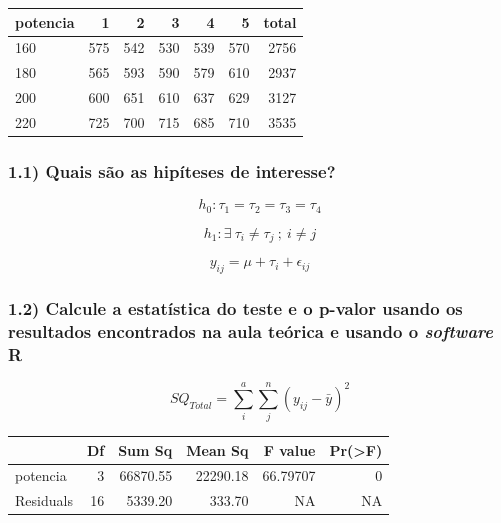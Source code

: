 \documentclass[
  a4paper]{article}
\begin{document}
\begin{longtable}[]{@{}lrrrrrr@{}}
\toprule()
potencia & 1 & 2 & 3 & 4 & 5 & total \\
\midrule()
\endhead
160 & 575 & 542 & 530 & 539 & 570 & 2756 \\
180 & 565 & 593 & 590 & 579 & 610 & 2937 \\
200 & 600 & 651 & 610 & 637 & 629 & 3127 \\
220 & 725 & 700 & 715 & 685 & 710 & 3535 \\
\bottomrule()
\end{longtable}

\newpage

\hypertarget{quais-suxe3o-as-hipuxedteses-de-interesse}{%
\subsubsection{1.1) Quais são as hipíteses de
interesse?}\label{quais-suxe3o-as-hipuxedteses-de-interesse}}

\[h_0: \tau_1 = \tau_2 = \tau_3 = \tau_4 \]

\[h_1: \exists \ \tau_i \neq \tau_j \ ; \ i \neq j\]

\[y_{ij} = \mu + \tau_i + \epsilon_{ij}\]

\hypertarget{calcule-a-estatuxedstica-do-teste-e-o-p-valor-usando-os-resultados-encontrados-na-aula-teuxf3rica-e-usando-o-software-r}{%
\subsubsection{\texorpdfstring{1.2) Calcule a estatística do teste e o
p-valor usando os resultados encontrados na aula teórica e usando o
\emph{software}
\textbf{R}}{1.2) Calcule a estatística do teste e o p-valor usando os resultados encontrados na aula teórica e usando o software R}}\label{calcule-a-estatuxedstica-do-teste-e-o-p-valor-usando-os-resultados-encontrados-na-aula-teuxf3rica-e-usando-o-software-r}}

\[ SQ_{Total} = \sum_i^a\sum_j^n(y_{ij}-\bar{y})^2 \]

\begin{longtable}[]{@{}lrrrrr@{}}
\toprule()
& Df & Sum Sq & Mean Sq & F value & Pr(\textgreater F) \\
\midrule()
\endhead
potencia & 3 & 66870.55 & 22290.18 & 66.79707 & 0 \\
Residuals & 16 & 5339.20 & 333.70 & NA & NA \\
\bottomrule()
\end{longtable}
\end{document}
